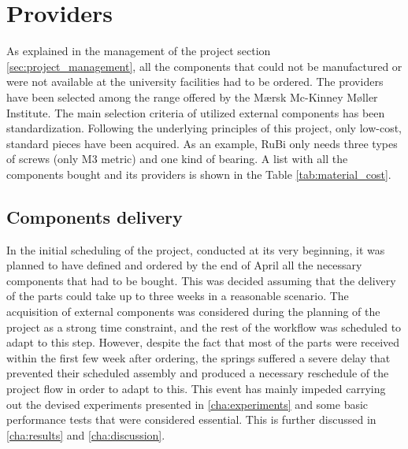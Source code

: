\section{Providers} %
\label{sec:providers}
As explained in the management of the project section \ref{sec:project_management}, all the components that could not be manufactured or were not available at the university facilities had to be ordered.
The providers have been selected among the range offered by the Mærsk Mc-Kinney Møller Institute.
The main selection criteria of utilized external components has been standardization.
Following the underlying principles of this project, only low-cost, standard pieces have been acquired. As an example, RuBi only needs three types of screws (only M3 metric) and one kind of bearing.
A list with all the components bought and its providers is shown in the Table \ref{tab:material_cost}. 

\subsection{Components delivery} %
\label{sub:components_delivery}
In the initial scheduling of the project, conducted at its very beginning, it was planned to have defined and ordered by the end of April all the necessary components that had to be bought.
This was decided assuming that the delivery of the parts could take up to three weeks in a reasonable scenario.
The acquisition of external components was considered during the planning of the project as a strong time constraint, and the rest of the workflow was scheduled to adapt to this step.
However, despite the fact that most of the parts were received within the first few week after ordering, the springs suffered a severe delay that prevented their scheduled assembly and produced a necessary reschedule of the project flow in order to adapt to this.
This event has mainly impeded carrying out the devised experiments presented in \ref{cha:experiments} and some basic performance tests that were considered essential.
This is further discussed in \ref{cha:results} and \ref{cha:discussion}.


